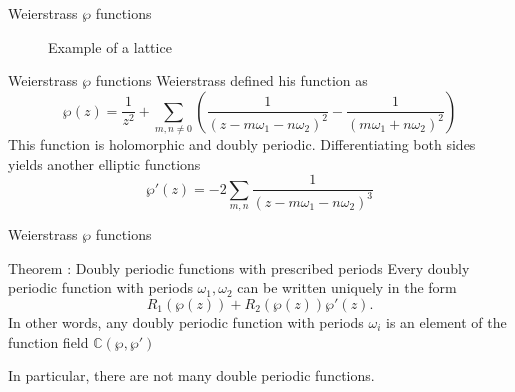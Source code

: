 \documentclass[pdf]{beamer}
\begin{document}
\begin{frame}{Weierstrass $\wp$ functions}
    \begin{figure}[h]
        \centering
        \caption{Example of a lattice}
        \label{fig:example}
    \end{figure}
\end{frame}
\begin{frame}{Weierstrass $\wp$ functions}
    Weierstrass defined his function as
    \[\wp(z) = \dfrac{1}{z^2}+ \sum_{m,n \ne 0}\left(\dfrac{1}{(z-m\omega_1-n\omega_2)^2} -\dfrac{1}{(m\omega_1+n\omega_2)^2}\right)\]
    This function is holomorphic and doubly periodic.
    \pause
    Differentiating both sides yields another elliptic functions
    \[\wp'(z) = -2 \sum_{m,n}\dfrac{1}{(z-m\omega_1-n\omega_2)^3}\]
\end{frame}
\begin{frame}{Weierstrass $\wp$ functions}
    \begin{block}{Theorem : Doubly periodic functions with prescribed periods}
        Every doubly periodic function with periods $\omega_1,\omega_2$ can be written uniquely in the form
        \[R_1(\wp(z))+ R_2(\wp(z))\wp'(z).\]
        In other words, any doubly periodic function with periods $\omega_i$ is an element of the function field $\mathbb{C}(\wp,\wp')$
    \end{block}
    In particular, there are not many double periodic functions.
\end{frame}
\end{document}

